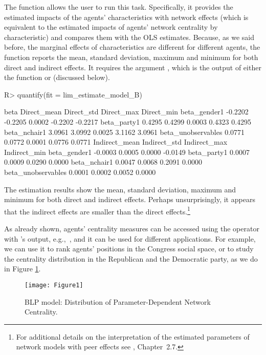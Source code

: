 \documentclass[nojss]{jss}
\begin{document}
The function  allows the user to run this task. 
Specifically, it provides the estimated impacts of the agents'
characteristics with network effects (which is equivalent to the estimated
impacts of agents' network centrality by characteristic) and compares them
with the OLS estimates.  Because, as we said before, the marginal effects of
characteristics are different for different agents, the function
 reports the mean, standard deviation, maximum and minimum
for both direct and indirect effects.  It requires the argument ,
which is the output of either the function  or
 (discussed below).
%
\begin{CodeChunk}
\begin{CodeInput}
R> quantify(fit = lim_estimate_model_B)
\end{CodeInput}
\begin{CodeOutput}
                      beta Direct_mean Direct_std Direct_max Direct_min
beta_gender1       -0.2202     -0.2205     0.0002    -0.2202    -0.2217
beta_party1         0.4295      0.4299     0.0003     0.4323     0.4295
beta_nchair1        3.0961      3.0992     0.0025     3.1162     3.0961
beta_unobservables  0.0771      0.0772     0.0001     0.0776     0.0771
                   Indirect_mean Indirect_std Indirect_max Indirect_min
beta_gender1             -0.0003       0.0005       0.0000      -0.0149
beta_party1               0.0007       0.0009       0.0290       0.0000
beta_nchair1              0.0047       0.0068       0.2091       0.0000
beta_unobservables        0.0001       0.0002       0.0052       0.0000
\end{CodeOutput}
\end{CodeChunk}
%
The estimation results show the mean, standard deviation, maximum and
minimum for both direct and indirect effects.  Perhaps unsurprisingly, it
appears that the indirect effects are smaller than the direct
effects.\footnote{For additional details on the interpretation of the
estimated parameters of network models with peer effects see
\cite{LeSage:2009}, Chapter~2.7.}

As already shown, agents' centrality measures can be accessed using the
operator \code{\$} with 's output, e.g.,~,
and it can be used for different
applications.  For example, we can use it to rank agents' positions in the
Congress social space, or to study the centrality distribution in the
Republican and the Democratic party, as we do in Figure \ref{fig:figure1}.
%
\begin{figure}[t!]
\centering
\texttt{[image: Figure1]}
\caption{\label{fig:figure1} BLP model: Distribution of Parameter-Dependent
Network Centrality.}
\end{figure}
%
\end{document}
